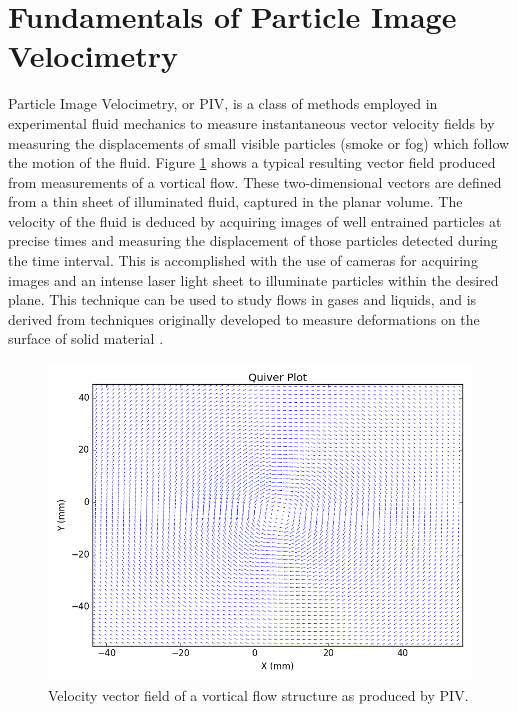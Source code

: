 \section{Fundamentals of Particle Image Velocimetry}

Particle Image Velocimetry, or PIV, is a class of methods employed in 
experimental fluid mechanics to measure instantaneous vector velocity fields by 
measuring the displacements of small visible particles (smoke or fog) which 
follow the motion of the fluid. Figure \ref{fig:quiver_example} shows a typical 
resulting vector field produced from measurements of a vortical flow. 
These two-dimensional vectors are defined from a thin sheet 
of illuminated fluid, captured in the planar volume. The velocity of the fluid 
is deduced by acquiring images of well entrained particles at precise times and 
measuring the displacement of those particles detected during the time 
interval. This is accomplished with the use of cameras for acquiring images 
and an intense laser light sheet to illuminate particles within the desired 
plane. This technique can be used to study flows in gases and liquids, and is 
derived from techniques originally developed to measure deformations on the 
surface of solid material \cite{arroyo1991,adrian1991}.

\vspace{20pt}
\begin{figure}[H]
	\centering
	\includegraphics[width=5in]{figs/example_vortex_figs/example_quiver}
	\caption{Velocity vector field of a vortical flow structure as produced by 
	PIV.}
	\label{fig:quiver_example}
\end{figure}

